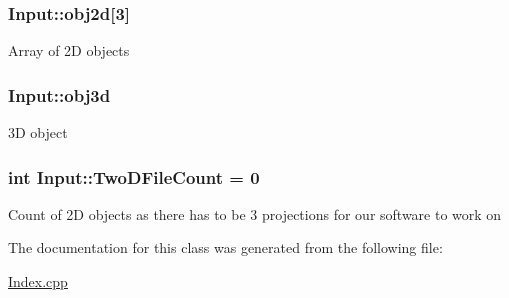 \subsubsection[{\texorpdfstring{obj2d}{obj2d}}]{ Input\+::obj2d\mbox{[}3\mbox{]}}\hypertarget{classInput_a9564e8dcf0ba881f46a89e51840836d9}{}\label{classInput_a9564e8dcf0ba881f46a89e51840836d9}
Array of 2D objects 
\subsubsection[{\texorpdfstring{obj3d}{obj3d}}]{ Input\+::obj3d}\hypertarget{classInput_ab12646f36b9b1eeeb3aa09adf8cec077}{}\label{classInput_ab12646f36b9b1eeeb3aa09adf8cec077}
3D object 
\subsubsection[{\texorpdfstring{Two\+D\+File\+Count}{TwoDFileCount}}]{\setlength{\rightskip}{0pt plus 5cm}int Input\+::\+Two\+D\+File\+Count = 0}\hypertarget{classInput_a82141fe9142aec447f9ef52fd2f78c73}{}\label{classInput_a82141fe9142aec447f9ef52fd2f78c73}
Count of 2D objects as there has to be 3 projections for our software to work on 

The documentation for this class was generated from the following file\+:\begin{DoxyCompactItemize}
\item 
\hyperlink{Index_8cpp}{Index.\+cpp}\end{DoxyCompactItemize}
